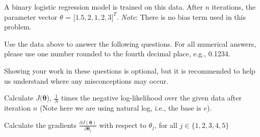 \documentclass[11pt,addpoints,answers]{exam}
\newcommand{\thetav     }{\boldsymbol \theta     }
\begin{document}
A binary logistic regression model is trained on this data. After $n$ iterations, the parameter vector $\theta$ = $\lbrack 1.5, 2, 1, 2, 3 \rbrack^T$. \textit{Note}: There is no bias term used in this problem.

Use the data above to answer the following questions. For all numerical answers, please use one number rounded to the  fourth decimal place, e.g., 0.1234.

Showing your work in these questions is optional, but it is recommended to help us understand where any misconceptions may occur.

\begin{questions}
    \question[2] Calculate $J(\thetav$), $\frac{1}{N}$ times the negative log-likelihood over the given data after iteration $n$ (Note here we are using natural log, i.e., the base is $e$). 
    
    \begin{your_solution}[title=$J(\thetav)$,height=2cm,width=3cm]
    \end{your_solution}
    
    \begin{your_solution}[title=Work,height=8cm,width=15.3cm]
    \end{your_solution}
    
    \clearpage
    
    \question[2] Calculate the gradients $\frac{\partial J(\thetav)}{\partial \thetav_j}$ with respect to $\theta_{j}$, for all $j \in \{1, 2, 3, 4, 5\}$

    \begin{your_solution}[title=$\partial J(\thetav)/\partial \thetav_1$,height=1.8cm,width=3cm]
    \end{your_solution}
    \begin{your_solution}[title=$\partial J(\thetav)/\partial \thetav_2$,height=1.8cm,width=3cm]
    \end{your_solution}
    \begin{your_solution}[title=$\partial J(\thetav)/\partial \thetav_3$,height=1.8cm,width=3cm]
    \end{your_solution}
    \begin{your_solution}[title=$\partial J(\thetav)/\partial \thetav_4$,height=1.8cm,width=3cm]
    \end{your_solution}
    \begin{your_solution}[title=$\partial J(\thetav)/\partial \thetav_5$,height=1.8cm,width=3cm]
    \end{your_solution}
    

\end{questions}
\end{document}
